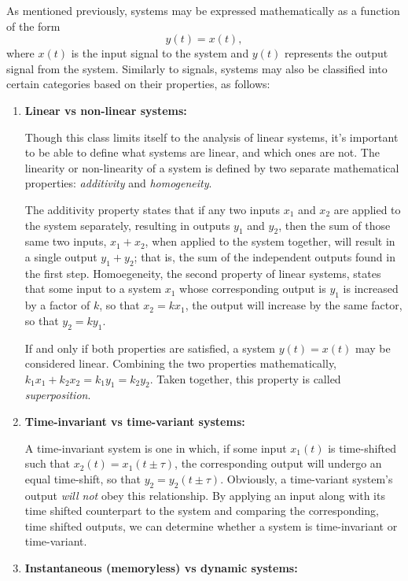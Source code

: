 \documentclass{article}
\begin{document}
As mentioned previously, systems may be expressed mathematically as a function of the form \[
  y(t) = x(t),
\]
where \(x(t)\) is the input signal to the system and \(y(t)\) represents the output signal from the system. Similarly to signals, systems may also be classified into certain categories based on their properties, as follows:
\begin{enumerate}
	\item \textbf{Linear vs non-linear systems:} 
		
	Though this class limits itself to the analysis of linear systems, it's important to be able to define what systems are linear, and which ones are not. The linearity or non-linearity of a system is defined by two separate mathematical properties: \textit{additivity} and \textit{homogeneity}. 

	The additivity property states that if any two inputs \(x_1\) and \(x_2\) are applied to the system separately, resulting in outputs \(y_1\) and \(y_2\), then the sum of those same two inputs, \(x_1 + x_2\), when applied to the system together, will result in a single output \(y_1 + y_2\); that is, the sum of the independent outputs found in the first step. Homoegeneity, the second property of linear systems, states that some input to a system \(x_1\) whose corresponding output is \(y_1\) is increased by a factor of \(k\), so that \(x_2 = kx_1\), the output will increase by the same factor, so that \(y_2 = ky_1\).

If and only if both properties are satisfied, a system \(y(t) = x(t) \) may be considered linear. Combining the two properties mathematically, \(k_1x_1 + k_2x_2 = k_1y_1 = k_2y_2\). Taken together, this property is called \textit{superposition}.

\item\textbf{Time-invariant vs time-variant systems:}

A time-invariant system is one in which, if some input \(x_1(t)\) is time-shifted such that \(x_2(t) = x_1(t\pm\tau)\), the corresponding output will undergo an equal time-shift, so that \(y_2 = y_2(t\pm\tau)\). Obviously, a time-variant system's output \textit{will not} obey this relationship. By applying an input along with its time shifted counterpart to the system and comparing the corresponding, time shifted outputs, we can determine whether a system is time-invariant or time-variant.

\item\textbf{Instantaneous (memoryless) vs dynamic systems:}


\end{enumerate}
\end{document}

